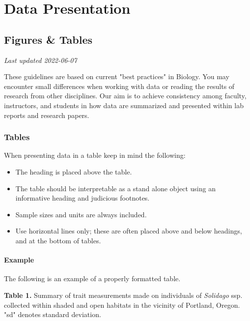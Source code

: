 \documentclass[
]{book}
\providecommand{\tightlist}{%
  \setlength{\itemsep}{0pt}\setlength{\parskip}{0pt}}
\begin{document}
\hypertarget{part-data-presentation}{%
\part*{Data Presentation}\label{part-data-presentation}}

\hypertarget{figures-tables}{%
\chapter{Figures \& Tables}\label{figures-tables}}

\emph{Last updated 2022-06-07}

These guidelines are based on current "best practices" in Biology. You may encounter small differences when working with data or reading the results of research from other disciplines. Our aim is to achieve consistency among faculty, instructors, and students in how data are summarized and presented within lab reports and research papers.

\hypertarget{tables}{%
\section{Tables}\label{tables}}

When presenting data in a table keep in mind the following:

\begin{itemize}
\tightlist
\item
  The heading is placed above the table.
\item
  The table should be interpretable as a stand alone object using an informative heading and judicious footnotes.
\item
  Sample sizes and units are always included.
\item
  Use horizontal lines only; these are often placed above and below headings, and at the bottom of tables.
\end{itemize}

\hypertarget{example}{%
\subsection*{Example}\label{example}}

The following is an example of a properly formatted table.

\textbf{Table 1.} Summary of trait measurements made on individuals of \emph{Solidago} ssp. collected within shaded and open habitats in the vicinity of Portland, Oregon. "sd" denotes standard deviation.
\end{document}
